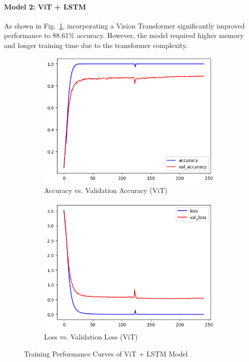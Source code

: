 \documentclass[conference]{IEEEtran}
\begin{document}
\paragraph*{Model 2: ViT + LSTM}
As shown in Fig.~\ref{fig:vit_training}, incorporating a Vision Transformer significantly improved performance to 88.61\% accuracy. However, the model required higher memory and longer training time due to the transformer complexity.

\begin{figure}[htbp]
\centering 
\begin{subfigure}[b]{0.48\linewidth} \includegraphics[width=\linewidth]{vit_acc.png} \caption{Accuracy vs. Validation Accuracy (ViT)} \end{subfigure} 
\hfill \begin{subfigure}[b]{0.48\linewidth} \includegraphics[width=\linewidth]{vit_loss.png} \caption{Loss vs. Validation Loss (ViT)} 
\end{subfigure} 
\caption{Training Performance Curves of ViT + LSTM Model} \label{fig:vit_training} 
\end{figure} 
\end{document}
